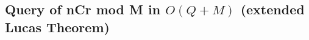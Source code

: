 \documentclass[9pt,landscape,a4paper,twocolumn]{extarticle}
\begin{document}
\subsection{Query of nCr mod M in $O(Q+M)$ (extended Lucas Theorem)}




% 







\end{document}
